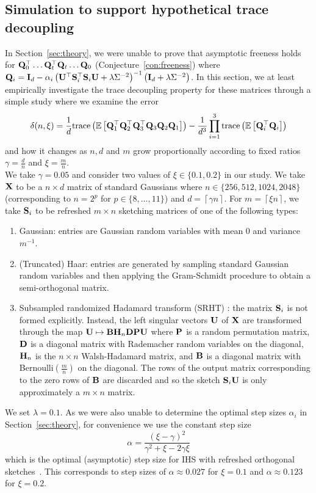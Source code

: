 \subsection{Simulation to support hypothetical trace decoupling} \label{sec:empirical}

In Section~\ref{sec:theory}, we were unable to prove that asymptotic freeness holds for $\mathbf{Q}_0^\top\ldots\mathbf{Q}_t^\top\mathbf{Q}_t\ldots\mathbf{Q}_0$ (Conjecture~\ref{con:freeness}) where $\mathbf{Q}_i=\mathbf{I}_d - \alpha_i\left(\mathbf{U}^\top\mathbf{S}_i^\top\mathbf{S}_i\mathbf{U} + \lambda\Sigma^{-2}\right)^{-1}\left(\mathbf{I}_d + \lambda\Sigma^{-2}\right)$. In this section, we at least empirically investigate the trace decoupling property for these matrices through a simple study where we examine the error
\[
\delta(n,\xi) = \frac{1}{d}\mathrm{trace}\left(\mathbb{E}\left[\mathbf{Q}_1^\top\mathbf{Q}_2^\top\mathbf{Q}_3^\top\mathbf{Q}_3\mathbf{Q}_2\mathbf{Q}_1\right]\right) - \frac{1}{d^3}\prod_{i=1}^3\mathrm{trace}\left(\mathbb{E}\left[\mathbf{Q}_i^\top\mathbf{Q}_i\right]\right)
\]
and how it changes as $n,d$ and $m$ grow proportionally according to fixed ratios $\gamma=\frac{d}{n}$ and $\xi=\frac{m}{n}$.
\\

We take $\gamma=0.05$ and consider two values of $\xi\in\{0.1,0.2\}$ in our study. We take $\mathbf{X}$ to be a $n\times d$ matrix of \iid standard Gaussians where $n\in\{256,512,1024,2048\}$ (corresponding to $n=2^p$ for $p\in\{8,\ldots,11\}$) and $d=\left\lceil{\gamma n}\right\rceil$. For $m=\left\lceil{\xi n}\right\rceil$, we take $\mathbf{S}_i$ to be refreshed $m\times n$ sketching matrices of one of the following types:
\begin{enumerate}
\item
\iid Gaussian: entries are \iid Gaussian random variables with mean 0 and variance $m^{-1}$.
\item
(Truncated) Haar: entries are generated by sampling \iid standard Gaussian random variables and then applying the Gram-Schmidt procedure to obtain a semi-orthogonal matrix.
\item
Subsampled randomized Hadamard transform (SRHT) \citep{Lacotte:2020}: the matrix $\mathbf{S}_i$ is not formed explicitly. Instead, the left singular vectors $\mathbf{U}$ of $\mathbf{X}$ are transformed through the map $\mathbf{U}\mapsto \mathbf{B}\mathbf{H}_n\mathbf{D}\mathbf{P}\mathbf{U}$ where $\mathbf{P}$ is a random permutation matrix, $\mathbf{D}$ is a diagonal matrix with Rademacher random variables on the diagonal, $\mathbf{H}_n$ is the $n\times n$ Walsh-Hadamard matrix, and $\mathbf{B}$ is a diagonal matrix with Bernoulli$\left(\frac{m}{n}\right)$ on the diagonal. The rows of the output matrix corresponding to the zero rows of $\mathbf{B}$ are discarded and so the sketch $\mathbf{S}_i\mathbf{U}$ is only approximately a $m\times n$ matrix.
\end{enumerate}
We set $\lambda=0.1$. As we were also unable to determine the optimal step sizes $\alpha_i$ in Section~\ref{sec:theory}, for convenience we use the constant step size
\[
\alpha= \frac{(\xi-\gamma)^2}{\gamma^2+\xi-2\gamma\xi}
\]
which is the optimal (asymptotic) step size for IHS with refreshed orthogonal sketches~\citep{Lacotte:2020}. This corresponds to step sizes of $\alpha\approx0.027$ for $\xi=0.1$ and $\alpha\approx0.123$ for $\xi=0.2$.
\\

